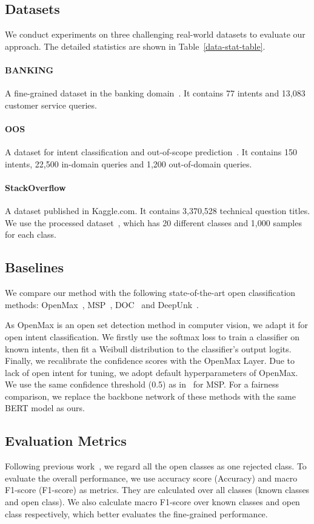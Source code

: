 \documentclass[letterpaper]{article} %
\begin{document}
\subsection{Datasets}
We conduct experiments on three challenging real-world datasets to evaluate our approach. The detailed statistics are shown in Table~\ref{data-stat-table}.
\paragraph{BANKING}
A fine-grained dataset in the banking domain~\cite{Casanueva2020}. It contains 77 intents and 13,083 customer service queries.
\paragraph{OOS}
A dataset for intent classification and out-of-scope prediction~\citep{larson-etal-2019-evaluation}. It contains 150 intents, 22,500 in-domain queries and 1,200 out-of-domain queries.

\paragraph{StackOverflow}
A dataset published in Kaggle.com. It contains 3,370,528 technical question titles. We use the processed dataset~\citep{xu2015short}, which has 20 different classes and 1,000 samples for each class.

\subsection{Baselines}
We compare our method with the following state-of-the-art open classification methods: OpenMax~\citep{bendale2016towards}, MSP~\cite{hendrycks17baseline}, DOC~\cite{Shu2017DOCDO} and DeepUnk~\cite{lin-xu-2019-deep}.

As OpenMax is an open set detection method in computer vision, we adapt it for open intent classification.  We firstly use the softmax loss to train a classifier on known intents, then fit a Weibull distribution to the classifier's output logits. Finally, we recalibrate the confidence scores with the OpenMax Layer. Due to lack of open intent for tuning, we adopt default hyperparameters of OpenMax. We use the same confidence threshold (0.5) as in~\cite{lin-xu-2019-deep} for MSP. For a fairness comparison, we replace the backbone network of these methods with the same BERT model as ours.

\subsection{Evaluation Metrics}
Following previous work~\cite{Shu2017DOCDO,lin-xu-2019-deep}, we regard all the open classes as one rejected class.  To evaluate the overall performance, we use accuracy score (Accuracy) and macro F1-score (F1-score) as metrics. They are calculated over all classes (known classes and open class). We also calculate macro F1-score over known classes and open class respectively, which better evaluates the fine-grained performance.
\end{document}
